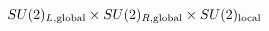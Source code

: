 \begin{equation}
SU(2)_{L,{\rm global}} \times SU(2)_{R, {\rm global}} \times SU(2)_{\rm local}
\end{equation}

